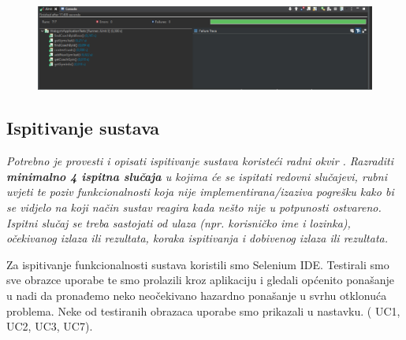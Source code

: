 				
			\noindent {}

			\begin{figure}[H]
    			\hspace*{-1.5cm}
    			\includegraphics[scale=0.5]{slike/rezultati.PNG} %
    			\centering
    			\label{fig:promjene}
    	    \end{figure}
	

			\subsection{Ispitivanje sustava}
			
			 \textit{Potrebno je provesti i opisati ispitivanje sustava koristeći radni okvir . Razraditi \textbf{minimalno 4 ispitna slučaja} u kojima će se ispitati redovni slučajevi, rubni uvjeti te poziv funkcionalnosti koja nije implementirana/izaziva pogrešku kako bi se vidjelo na koji način sustav reagira kada nešto nije u potpunosti ostvareno. Ispitni slučaj se treba sastojati od ulaza (npr. korisničko ime i lozinka), očekivanog izlaza ili rezultata, koraka ispitivanja i dobivenog izlaza ili rezultata.\\ }
			 
		
		 	 Za ispitivanje funkcionalnosti sustava koristili smo Selenium IDE. Testirali smo
		 	 sve obrazce uporabe te smo prolazili kroz aplikaciju i gledali općenito ponašanje
		 	 u nadi da pronađemo neko neočekivano hazardno ponašanje u svrhu otklonuća problema.
		 	 Neke od testiranih obrazaca uporabe smo prikazali u nastavku. ( UC1, UC2, UC3, UC7).
		 	 
		 	 
	
